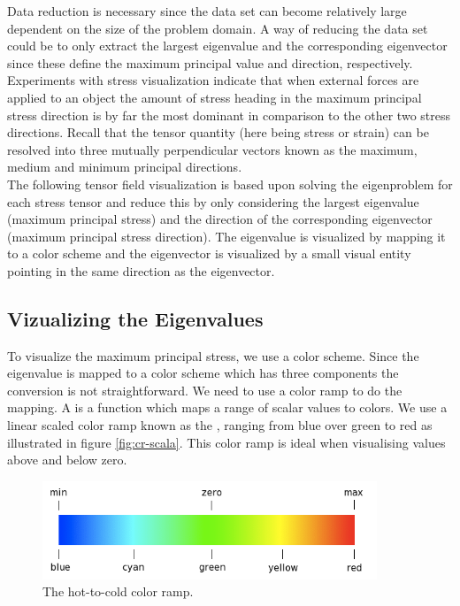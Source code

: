 Data reduction is necessary since the data set can become relatively
large dependent on the size of the problem domain.  
A way of reducing the data set
could be to only extract the largest eigenvalue and the corresponding
eigenvector since these define the maximum principal value and
direction, respectively. 
%
Experiments with stress visualization indicate that when external
forces are applied to an object the amount of stress heading in the
maximum principal stress direction is by far the most dominant in comparison
to the other two stress directions. Recall that the tensor quantity (here
being stress or strain) can be resolved into three mutually perpendicular
vectors known as the maximum, medium and minimum principal
directions. \\ 

The following tensor field visualization is based upon solving the
eigenproblem for each stress tensor and reduce this by only
considering the largest eigenvalue (maximum principal stress) and the direction of the
corresponding eigenvector (maximum principal stress direction). 
The eigenvalue is visualized by
mapping it to a color scheme and the eigenvector is visualized by a
small visual entity pointing in the same direction as the eigenvector.


\subsection{Vizualizing the Eigenvalues}
To visualize the maximum principal stress, we use a
color scheme. Since the eigenvalue is mapped to a color scheme which
has three components the conversion is not straightforward.
We need to use a color ramp to do the mapping.
%
A  %
is a function which maps a range of scalar values
to colors. We use a linear scaled color ramp known as the
, ranging from blue over green to
red as illustrated in figure \vref{fig:cr-scala}. This color ramp is
ideal when visualising values above and below zero.

\begin{figure}
  \centering
  \includegraphics[width=10cm]{./images/helper_tools_color_ramp_scala.png}
\caption{The hot-to-cold color ramp.}
\label{fig:cr-scala}
\end{figure}

